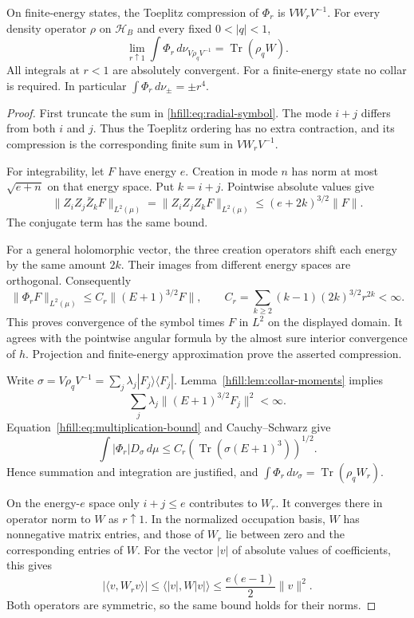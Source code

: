 \begin{theorem}\label{hfill:thm:radial-limit}
On finite-energy states, the Toeplitz compression of $\Phi_r$ is
$VW_rV^{-1}$.
For every density operator $\rho$ on $\mathcal H_B$ and every
fixed $0<|q|<1$,
\begin{equation}\label{hfill:eq:radial-limit}
 \lim_{r\uparrow1}\int\Phi_r\,d\nu_{V\rho_qV^{-1}}
 =\operatorname{Tr}(\rho_qW).
\end{equation}
All integrals at $r<1$ are absolutely convergent.
For a finite-energy state no collar is required.
In particular
$\int\Phi_r\,d\nu_\pm=\pm r^4$.
\end{theorem}

\begin{proof}
First truncate the sum in \eqref{hfill:eq:radial-symbol}.
The mode $i+j$ differs from both $i$ and $j$.
Thus the Toeplitz ordering has no extra contraction, and its
compression is the corresponding finite sum in $VW_rV^{-1}$.

For integrability, let $F$ have energy $e$.
Creation in mode $n$ has norm at most $\sqrt{e+n}$ on that energy space.
Put $k=i+j$.
Pointwise absolute values give
\[
 \|Z_iZ_j\bar Z_kF\|_{L^2(\mu)}
 =\|Z_iZ_jZ_kF\|_{L^2(\mu)}
 \leq(e+2k)^{3/2}\|F\|.
\]
The conjugate term has the same bound.

For a general holomorphic vector, the three creation operators shift
each energy by the same amount $2k$.
Their images from different energy spaces are orthogonal.
Consequently
\begin{equation}\label{hfill:eq:multiplication-bound}
 \|\Phi_rF\|_{L^2(\mu)}
 \leq C_r\|(E+1)^{3/2}F\|,
 \qquad
 C_r=\sum_{k\geq2}(k-1)(2k)^{3/2}r^{2k}<\infty.
\end{equation}
This proves convergence of the symbol times $F$ in $L^2$ on the
displayed domain.
It agrees with the pointwise angular formula by the almost sure
interior convergence of $h$.
Projection and finite-energy approximation prove the asserted compression.

Write $\sigma=V\rho_qV^{-1}=\sum_j\lambda_j|F_j\rangle\langle F_j|$.
Lemma~\ref{hfill:lem:collar-moments} implies
\[
 \sum_j\lambda_j\|(E+1)^{3/2}F_j\|^2<\infty.
\]
Equation~\eqref{hfill:eq:multiplication-bound} and Cauchy--Schwarz give
\[
 \int|\Phi_r|D_\sigma\,d\mu
 \leq C_r\left(\operatorname{Tr}(\sigma(E+1)^3)\right)^{1/2}.
\]
Hence summation and integration are justified, and
$\int\Phi_r\,d\nu_\sigma=\operatorname{Tr}(\rho_qW_r)$.

On the energy-$e$ space only $i+j\leq e$ contributes to $W_r$.
It converges there in operator norm to $W$ as $r\uparrow1$.
In the normalized occupation basis, $W$ has nonnegative matrix entries,
and those of $W_r$ lie between zero and the corresponding entries of $W$.
For the vector $|v|$ of absolute values of coefficients, this gives
\[
 |\langle v,W_rv\rangle|
 \leq\langle |v|,W|v|\rangle
 \leq\frac{e(e-1)}2\|v\|^2.
\]
Both operators are symmetric, so the same bound holds for their norms.


\end{proof}
